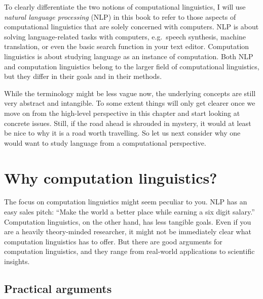 To clearly differentiate the two notions of computational linguistics, I will use \emph{natural language processing} (NLP) in this book to refer to those aspects of computational linguistics that are solely concerned with computers.
NLP is about solving language-related tasks with computers, e.g.~speech synthesis, machine translation, or even the basic search function in your text editor.
Computation linguistics is about studying language as an instance of computation.
Both NLP and computation linguistics belong to the larger field of computational linguistics, but they differ in their goals and in their methods.


While the terminology might be less vague now, the underlying concepts are still very abstract and intangible.
To some extent things will only get clearer once we move on from the high-level perspective in this chapter and start looking at concrete issues.
Still, if the road ahead is shrouded in mystery, it would at least be nice to why it is a road worth travelling.
So let us next consider why one would want to study language from a computational perspective. %


\section{Why computation linguistics?}
\label{sec:formal_arguments}

The focus on computation linguistics might seem peculiar to you.
NLP has an easy sales pitch: ``Make the world a better place while earning a six digit salary.''
Computation linguistics, on the other hand, has less tangible goals.
Even if you are a heavily theory-minded researcher, it might not be immediately clear what computation linguistics has to offer.
But there are good arguments for computation linguistics, and they range from real-world applications to scientific insights.

\subsection{Practical arguments}
\label{ssec:formal_arguments_practical}

